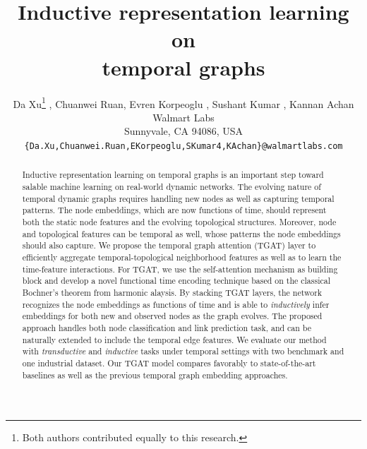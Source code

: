 \documentclass{article} %
\title{Inductive representation learning on \\ temporal graphs}
\author{Da Xu\thanks{Both authors contributed equally to this research.} , Chuanwei Ruan\footnotemark[1] , Evren Korpeoglu , Sushant Kumar , Kannan Achan \\
Walmart Labs \\
Sunnyvale, CA 94086, USA \\
\texttt{\{Da.Xu,Chuanwei.Ruan,EKorpeoglu,SKumar4,KAchan\}@walmartlabs.com}
}
\begin{document}
\maketitle

\begin{abstract}
Inductive representation learning on temporal graphs is an important step toward salable machine learning on real-world dynamic networks. The evolving nature of temporal dynamic graphs requires handling new nodes as well as capturing temporal patterns. The node embeddings, which are now functions of time, should represent both the static node features and the evolving topological structures. Moreover, node and topological features can be temporal as well, whose patterns the node embeddings should also capture. We propose the temporal graph attention (TGAT) layer to efficiently aggregate temporal-topological neighborhood features as well as to learn the time-feature interactions. For TGAT, we use the self-attention mechanism as building block and develop a novel functional time encoding technique based on the classical Bochner's theorem from harmonic alaysis. By stacking TGAT layers, the network recognizes the node embeddings as functions of time and is able to \emph{inductively} infer embeddings for both new and observed nodes as the graph evolves. The proposed approach handles both node classification and link prediction task, and can be naturally extended to include the temporal edge features. We evaluate our method with \emph{transductive} and \emph{inductive} tasks under temporal settings with two benchmark and one industrial dataset. Our TGAT model compares favorably to state-of-the-art baselines as well as the previous temporal graph embedding approaches.
\end{abstract}
\end{document}
